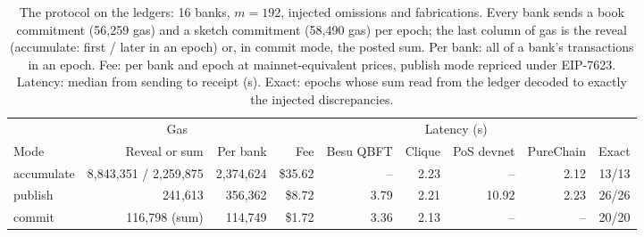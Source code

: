 \begin{table}[!htbp]\centering\small
\caption{The protocol on the ledgers: 16 banks, $m=192$, injected omissions and fabrications. Every bank sends a book commitment (56{,}259 gas) and a sketch commitment (58{,}490 gas) per epoch; the last column of gas is the reveal (accumulate: first / later in an epoch) or, in commit mode, the posted sum. Per bank: all of a bank's transactions in an epoch. Fee: per bank and epoch at mainnet-equivalent prices, publish mode repriced under EIP-7623. Latency: median from sending to receipt (s). Exact: epochs whose sum read from the ledger decoded to exactly the injected discrepancies.}\label{tab:chain}
\begin{adjustbox}{max width=\linewidth}\begin{tabular}{lrrrrrrrr}\toprule
 & \multicolumn{2}{c}{Gas} & & \multicolumn{4}{c}{Latency (s)} & \\
\cmidrule(lr){2-3}\cmidrule(lr){5-8}
Mode & Reveal or sum & Per bank & Fee & Besu QBFT & Clique & PoS devnet & PureChain & Exact \\\midrule
accumulate & 8{,}843{,}351 / 2{,}259{,}875 & 2{,}374{,}624 & \$35.62 & -- & 2.23 & -- & 2.12 & 13/13 \\
publish & 241{,}613 & 356{,}362 & \$8.72 & 3.79 & 2.21 & 10.92 & 2.23 & 26/26 \\
commit & 116{,}798 (sum) & 114{,}749 & \$1.72 & 3.36 & 2.13 & -- & -- & 20/20 \\
\bottomrule\end{tabular}\end{adjustbox}\end{table}